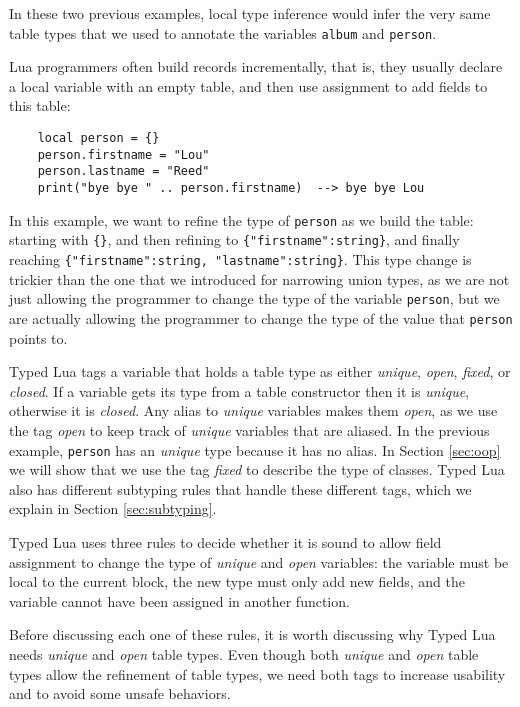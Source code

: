 In these two previous examples, local type inference would infer the
very same table types that we used to annotate the variables
\texttt{album} and \texttt{person}.

Lua programmers often build records incrementally, that is,
they usually declare a local variable with an empty table,
and then use assignment to add fields to this table:
\begin{verbatim}
    local person = {}
    person.firstname = "Lou"
    person.lastname = "Reed"
    print("bye bye " .. person.firstname)  --> bye bye Lou
\end{verbatim}

In this example, we want to refine the type of \texttt{person} as
we build the table:
starting with \texttt{\{\}}, and then refining to \texttt{\{"firstname":string\}},
and finally reaching \texttt{\{"firstname":string, "lastname":string\}}.
This type change is trickier than the one that we introduced for narrowing
union types, as we are not just allowing the programmer to change
the type of the variable \texttt{person}, but we are actually allowing
the programmer to change the type of the value that \texttt{person} points to.

Typed Lua tags a variable that holds a table type as either
\emph{unique}, \emph{open}, \emph{fixed}, or \emph{closed}.
If a variable gets its type from a table constructor then it is
\emph{unique}, otherwise it is \emph{closed}.
Any alias to \emph{unique} variables makes them \emph{open}, as we use the
tag \emph{open} to keep track of \emph{unique} variables that are aliased.
In the previous example, \texttt{person} has an \emph{unique} type
because it has no alias.
In Section \ref{sec:oop} we will show that we use the tag
\emph{fixed} to describe the type of classes.
Typed Lua also has different subtyping rules that handle these
different tags, which we explain in Section \ref{sec:subtyping}.

Typed Lua uses three rules to decide whether it is sound to
allow field assignment to change the type of \emph{unique} and
\emph{open} variables:
the variable must be local to the current block,
the new type must only add new fields, and
the variable cannot have been assigned in another function.

Before discussing each one of these rules, it is worth discussing
why Typed Lua needs \emph{unique} and \emph{open} table types.
Even though both \emph{unique} and \emph{open} table types
allow the refinement of table types, we need both tags to
increase usability and to avoid some unsafe behaviors.


